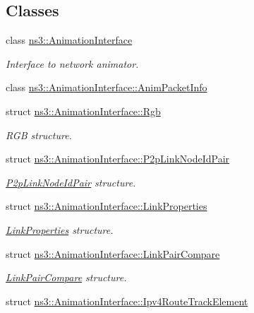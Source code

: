 \subsection*{Classes}
\begin{DoxyCompactItemize}
\item 
class \hyperlink{classns3_1_1AnimationInterface}{ns3\+::\+Animation\+Interface}
\begin{DoxyCompactList}\small\item\em Interface to network animator. \end{DoxyCompactList}\item 
class \hyperlink{classns3_1_1AnimationInterface_1_1AnimPacketInfo}{ns3\+::\+Animation\+Interface\+::\+Anim\+Packet\+Info}
\item 
struct \hyperlink{structns3_1_1AnimationInterface_1_1Rgb}{ns3\+::\+Animation\+Interface\+::\+Rgb}
\begin{DoxyCompactList}\small\item\em R\+GB structure. \end{DoxyCompactList}\item 
struct \hyperlink{structns3_1_1AnimationInterface_1_1P2pLinkNodeIdPair}{ns3\+::\+Animation\+Interface\+::\+P2p\+Link\+Node\+Id\+Pair}
\begin{DoxyCompactList}\small\item\em \hyperlink{structns3_1_1AnimationInterface_1_1P2pLinkNodeIdPair}{P2p\+Link\+Node\+Id\+Pair} structure. \end{DoxyCompactList}\item 
struct \hyperlink{structns3_1_1AnimationInterface_1_1LinkProperties}{ns3\+::\+Animation\+Interface\+::\+Link\+Properties}
\begin{DoxyCompactList}\small\item\em \hyperlink{structns3_1_1AnimationInterface_1_1LinkProperties}{Link\+Properties} structure. \end{DoxyCompactList}\item 
struct \hyperlink{structns3_1_1AnimationInterface_1_1LinkPairCompare}{ns3\+::\+Animation\+Interface\+::\+Link\+Pair\+Compare}
\begin{DoxyCompactList}\small\item\em \hyperlink{structns3_1_1AnimationInterface_1_1LinkPairCompare}{Link\+Pair\+Compare} structure. \end{DoxyCompactList}\item 
struct \hyperlink{structns3_1_1AnimationInterface_1_1Ipv4RouteTrackElement}{ns3\+::\+Animation\+Interface\+::\+Ipv4\+Route\+Track\+Element}

\end{DoxyCompactItemize}
